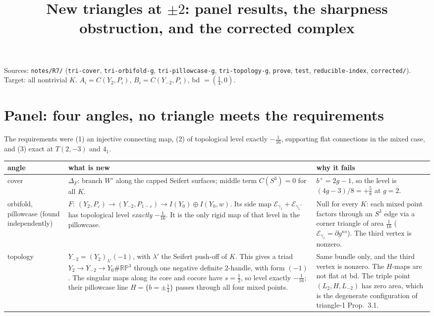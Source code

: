 \documentclass[10pt]{amsart}
\title{New triangles at $\pm2$: panel results, the sharpness obstruction, and the corrected complex}
\date{}
\begin{document}
\sloppy
\maketitle
\vspace{-2.5em}

\noindent Sources: \texttt{notes/R7/} (\texttt{tri-cover}, \texttt{tri-orbifold-g},
\texttt{tri-pillowcase-g}, \texttt{tri-topology-g}, \texttt{prove}, \texttt{test},
\texttt{reducible-index}, \texttt{corrected/}). Target: all nontrivial $K$. $A_i=C(Y_2,P_i)$,
$B_i=C(Y_{-2},P_i)$, bd $=(\frac14,0)$.

\section{Panel: four angles, no triangle meets the requirements}

The requirements were (1) an injective connecting map, (2) of topological level exactly
$-\frac1{16}$, supporting flat connections in the mixed case, and (3) exact at
$T(2,-3)$ and $4_1$.

\begin{center}\small
\begin{tabular}{p{2.1cm}p{7.4cm}p{6.2cm}}
angle & what is new & why it fails\\\hline
cover & $\Delta_F$: branch $W'$ along the capped Seifert surfaces; middle term $C(S^3)=0$ for all $K$. & $b^+=2g-1$, so the level is $(4g-3)/8=+\frac58$ at $g=2$.\\
orbifold, pillowcase (found independently) & $F:\ (Y_2,P_\varepsilon)\to(Y_{-2},P_{1-\varepsilon})\to I(Y_0)\oplus I(Y_0,w)$. Its side map $\mathcal E_{\gamma_1}+\mathcal E_{\gamma_1'}$ has topological level \emph{exactly} $-\frac1{16}$. It is the only rigid map of that level in the pillowcase. & Null for every $K$: each mixed point factors through an $S^3$ edge via a corner triangle of area $\frac1{16}$ ($\mathcal E_{\gamma_1}=\partial g^{ns}$). The third vertex is nonzero.\\
topology & $Y_{-2}=(Y_2)_{\lambda'}(-1)$, with $\lambda'$ the Seifert push-off of $K$. This gives a triad $Y_2\to Y_{-2}\to Y_0\#\mathbb{RP}^3$ through one negative definite 2-handle, with form $(-1)$. The singular maps along its core and cocore have $s=\frac12$, so level exactly $-\frac1{16}$; their pillowcase line $H=\{b=\pm\frac14\}$ passes through all four mixed points. & Same bundle only, and the third vertex is nonzero. The $H$-maps are not flat at bd. The triple point $(L_2,H,L_{-2})$ has zero area, which is the degenerate configuration of triangle-1 Prop.~3.1.
\end{tabular}
\end{center}
\end{document}
